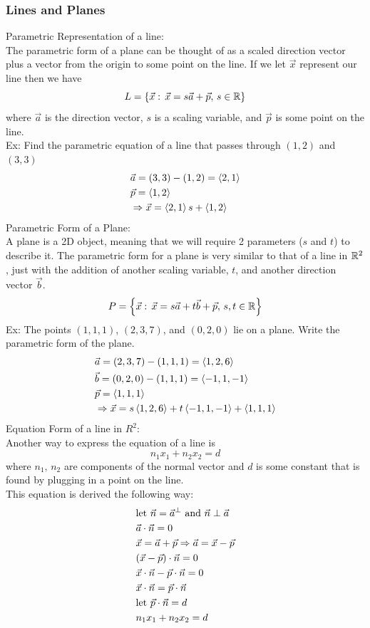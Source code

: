 \documentclass[11pt, fleqn]{article}
\begin{document}
\subsubsection{Lines and Planes}
Parametric Representation of a line:\\
The parametric form of a plane can be thought of as a scaled direction vector plus a vector from the origin to some point on the line. If we let $\vec{x}$ represent our line then we have
$$L=\left\{ \vec{x}:\,\vec{x}=s\vec{a}+\vec{p},\,s\in\mathbb{R} \right\}$$
where $\vec{a}$ is the direction vector, $s$ is a scaling variable, and $\vec{p}$ is some point on the line.\\
Ex: Find the parametric equation of a line that passes through $(1,2)$ and $(3,3)$
\begin{align*}
    &\vec{a}=(3,3)-(1,2)=\left\langle 2,1 \right\rangle\\
    &\vec{p}=\left\langle 1,2 \right\rangle\\
    &\Rightarrow\vec{x}=\left\langle 2,1 \right\rangle s+\left\langle 1,2 \right\rangle
\end{align*}
Parametric Form of a Plane:\\
A plane is a 2D object, meaning that we will require 2 parameters ($s$ and $t$) to describe it. The parametric form for a plane is very similar to that of a line in $\mathbb{R}^2$, just with the addition of another scaling variable, $t$, and another direction vector $\vec{b}$.
$$P=\left\{ \vec{x}:\,\vec{x}=s\vec{a}+t\vec{b}+\vec{p},\,s,t\in\mathbb{R} \right\}$$
Ex: The points $(1,1,1)$, $(2,3,7)$, and $(0,2,0)$ lie on a plane. Write the parametric form of the plane.
\begin{align*}
    &\vec{a}=(2,3,7)-(1,1,1)=\left\langle 1,2,6 \right\rangle\\
    &\vec{b}=(0,2,0)-(1,1,1)=\left\langle -1,1,-1 \right\rangle\\
    &\vec{p}=\left\langle 1,1,1 \right\rangle\\
    &\Rightarrow\vec{x}=s\left\langle 1,2,6 \right\rangle+t\left\langle -1,1,-1 \right\rangle+\left\langle 1,1,1 \right\rangle
\end{align*}
Equation Form of a line in $R^2$:\\
Another way to express the equation of a line is
$$n_1x_1+n_2x_2=d$$
where $n_1,\,n_2$ are components of the normal vector and $d$ is some constant that is found by plugging in a point on the line.\\
This equation is derived the following way:
\begin{align*}
    &\text{let }\vec{n}=\vec{a}^\perp\text{ and }\vec{n}\perp\vec{a}\\
    &\vec{a}\cdot\vec{n}=0\\
    &\vec{x}=\vec{a}+\vec{p}\Rightarrow\vec{a}=\vec{x}-\vec{p}\\
    &(\vec{x}-\vec{p})\cdot\vec{n}=0\\
    &\vec{x}\cdot\vec{n}-\vec{p}\cdot\vec{n}=0\\
    &\vec{x}\cdot\vec{n}=\vec{p}\cdot\vec{n}\\
    &\text{let }\vec{p}\cdot\vec{n}=d\\
    &n_1x_1+n_2x_2=d
\end{align*}
\end{document}
